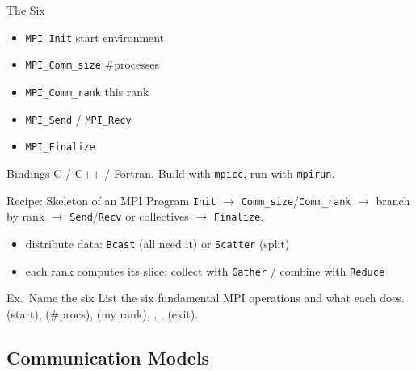     \begin{minipage}{0.4\linewidth}

\begin{definition}{The Six}
    \begin{itemize}
        \item \texttt{MPI\_Init} start environment
        \item \texttt{MPI\_Comm\_size} \#processes
        \item \texttt{MPI\_Comm\_rank} this rank
        \item \texttt{MPI\_Send} / \texttt{MPI\_Recv}
        \item \texttt{MPI\_Finalize}
    \end{itemize}
\end{definition}

\begin{concept}{Bindings}
    C / C++ / Fortran. Build with \texttt{mpicc}, run with \texttt{mpirun}.
\end{concept}

\end{minipage}
    \begin{minipage}{0.59\linewidth}

\begin{KR}{Recipe: Skeleton of an MPI Program}
    \texttt{Init} $\to$ \texttt{Comm\_size}/\texttt{Comm\_rank} $\to$ branch by rank $\to$ \texttt{Send}/\texttt{Recv} or collectives $\to$ \texttt{Finalize}.
    \begin{itemize}
        \item distribute data: \texttt{Bcast} (all need it) or \texttt{Scatter} (split)
        \item each rank computes its slice; collect with \texttt{Gather} / combine with \texttt{Reduce}
    \end{itemize}
\end{KR}

\end{minipage}

\begin{example2}{Ex.\ Name the six}
    List the six fundamental MPI operations and what each does.
     \\ 
     (start),  (\#procs),  (my rank), , ,  (exit).
\end{example2}

\subsection{Communication Models}

